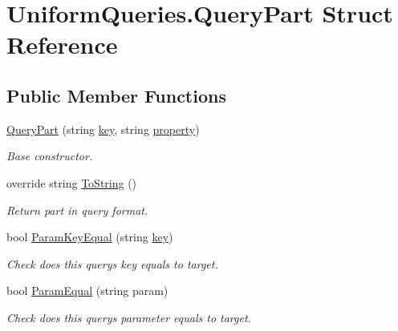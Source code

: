 \hypertarget{struct_uniform_queries_1_1_query_part}{}\section{Uniform\+Queries.\+Query\+Part Struct Reference}
\label{struct_uniform_queries_1_1_query_part}
\subsection*{Public Member Functions}
\begin{DoxyCompactItemize}
\item 
\mbox{\hyperlink{struct_uniform_queries_1_1_query_part_adabbcaa15ccf653f686d4f2bcd39ce09}{Query\+Part}} (string \mbox{\hyperlink{struct_uniform_queries_1_1_query_part_a24186fc4f67752331342e84554f806ff}{key}}, string \mbox{\hyperlink{struct_uniform_queries_1_1_query_part_aa8167f347217469ed47b298f2bc16381}{property}})
\begin{DoxyCompactList}\small\item\em Base constructor. \end{DoxyCompactList}\item 
override string \mbox{\hyperlink{struct_uniform_queries_1_1_query_part_acf5597530f693df3804fc2e638805245}{To\+String}} ()
\begin{DoxyCompactList}\small\item\em Return part in query format. \end{DoxyCompactList}\item 
bool \mbox{\hyperlink{struct_uniform_queries_1_1_query_part_a5252d13a0a8c211c47cba54f3749aad1}{Param\+Key\+Equal}} (string \mbox{\hyperlink{struct_uniform_queries_1_1_query_part_a24186fc4f67752331342e84554f806ff}{key}})
\begin{DoxyCompactList}\small\item\em Check does this query\textquotesingle{}s key equals to target. \end{DoxyCompactList}\item 
bool \mbox{\hyperlink{struct_uniform_queries_1_1_query_part_abda3bf2ddc04c911364a09655e8fc4f2}{Param\+Equal}} (string param)
\begin{DoxyCompactList}\small\item\em Check does this query\textquotesingle{}s parameter equals to target. \end{DoxyCompactList}\end{DoxyCompactItemize}
